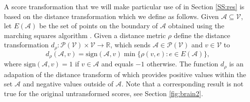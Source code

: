 A score transformation that we will make particular use of in Section \ref{SS:res} is based on the distance transformation which we define as follows. Given $\mathcal{A} \subseteq \mathcal{V}$, let $E(\mathcal{A})$ be the set of points on the boundary of $\mathcal{A}$ obtained using the marching squares algorithm \citep{Maple2003}. Given a distance metric $\rho$ define the distance transformation $d_{\rho}: \mathcal{P}(\mathcal{V}) \times \mathcal{V}\rightarrow \mathbb{R}$, which sends $\mathcal{A} \in \mathcal{P}(\mathcal{V})$ and $v\in \mathcal{V}$ to
\begin{equation*}
	d_{\rho}(\mathcal{A}, v) = \text{sign}(\mathcal{A}, v)\min\lbrace \rho(v, e): e \in E(\mathcal{A})\rbrace, 
\end{equation*}
where $ \text{sign}(\mathcal{A}, v) = 1 $ if $v\in \mathcal{A}$ and equals $-1$ otherwise. The function $d_{\rho}$ is an adapation of the distance transform of \cite{Borgefors1986} which provides positive values within the set $\mathcal{A}$ and negative values outside of $\mathcal{A}$. 
Note that a corresponding result is not true for the original untransformed scores, see Section \ref{fig:brain2}. 
